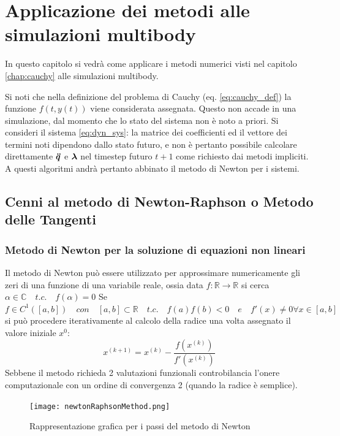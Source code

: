
\chapter{Applicazione dei metodi alle simulazioni multibody}
In questo capitolo si vedrà come applicare i metodi numerici visti nel capitolo \ref{chap:cauchy} alle simulazioni multibody.

Si noti che nella definizione del problema di Cauchy (eq. \ref{eq:cauchy_def}) la funzione $f(t, y(t))$ viene considerata assegnata. Questo non accade in una simulazione, dal momento che lo stato del sistema non è noto a priori. \newline
Si consideri il sistema \ref{eq:dyn_sys}: la matrice dei coefficienti ed il vettore dei termini noti dipendono dallo stato futuro, e non è pertanto possibile calcolare direttamente ${\boldsymbol{\Ddot{q}}}$ e ${\boldsymbol{\lambda}}$ nel timestep futuro $t+1$ come richiesto dai metodi impliciti. \newline A questi algoritmi andrà pertanto abbinato il metodo di Newton per i sistemi.


\section{Cenni al metodo di Newton-Raphson o Metodo delle Tangenti}
\subsection{Metodo di Newton per la soluzione di equazioni non lineari}
Il metodo di Newton \cite{Quarteroni} può essere utilizzato per approssimare numericamente gli zeri di una funzione di una variabile reale, ossia data \(f:\mathbb{R} \rightarrow \mathbb{R}\) si cerca $\alpha\in \mathbb{C}\quad t.c.\quad f(\alpha)=0 $ \newline
Se $f \in C^1([a,b])\quad con \quad [a,b]\subset\mathbb{R} \quad t.c. \quad f(a)f(b) < 0 \quad e \quad f'(x) \neq 0 \forall x \in [a,b]$ si può procedere iterativamente al calcolo della radice una volta assegnato il valore iniziale $x^{0}$:
\begin{equation} \label{eq:Newton_1d}
    x^{(k+1)} = x^{(k)} - \frac{f\left(x^{(k)}\right)}{f'\left(x^{(k)}\right)}
\end{equation}
Sebbene il metodo richieda 2 valutazioni funzionali controbilancia l'onere computazionale con un ordine di convergenza 2 (quando la radice è semplice).
\begin{figure}[h!]
\centering
\texttt{[image: newtonRaphsonMethod.png]}
\caption{Rappresentazione grafica per i passi del metodo di Newton}
 \label{fig:Newton_1d}
\end{figure}
